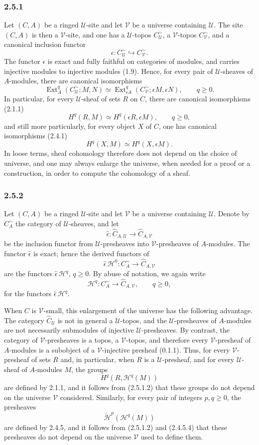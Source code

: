 \documentclass[11pt]{article}
\newcommand{\U}{\mathcal{U}}
\newcommand{\V}{\mathcal{V}}
\newcommand{\Hh}{\mathcal{H}}
\newcommand{\Ext}{\operatorname{Ext}}
\begin{document}
\subsubsection*{2.5.1}
Let $(C,A)$ be a ringed $\U$-site and let $\V$ be a universe containing $\U$. The site $(C,A)$ is then a $\V$-site, and one has a $\U$-topos $C^\sim_\U$, a $\V$-topos $C^\sim_\V$, and a canonical inclusion functor
\[
\epsilon:C^\sim_\U\hookrightarrow C^\sim_\V .
\]
The functor $\epsilon$ is exact and fully faithful on categories of modules, and carries injective modules to injective modules (1.9). Hence, for every pair of $\U$-sheaves of $A$-modules, there are canonical isomorphisms
\[
\Ext_A^q(C^\sim_\U;M,N)
\simeq
\Ext_{\epsilon A}^q(C^\sim_\V;\epsilon M,\epsilon N),
\qquad q\geq0.
\tag{2.5.1.1}
\]
In particular, for every $\U$-sheaf of sets $R$ on $C$, there are canonical isomorphisms (2.1.1)
\[
H^q(R,M)\simeq H^q(\epsilon R,\epsilon M),
\qquad q\geq0,
\tag{2.5.1.2}
\]
and still more particularly, for every object $X$ of $C$, one has canonical isomorphisms (2.4.1)
\[
H^q(X,M)\simeq H^q(X,\epsilon M).
\tag{2.5.1.3}
\]
In loose terms, sheaf cohomology therefore does not depend on the choice of universe, and one may always enlarge the universe, when needed for a proof or a construction, in order to compute the cohomology of a sheaf.

\subsubsection*{2.5.2}
Let $(C,A)$ be a ringed $\U$-site and let $\V$ be a universe containing $\U$. Denote by $C^\sim_A$ the category of $\U$-sheaves, and let
\[
\widehat\epsilon:\widehat C_{A,\U}\longrightarrow \widehat C_{A,\V}
\]
be the inclusion functor from $\U$-presheaves into $\V$-presheaves of $A$-modules. The functor $\widehat\epsilon$ is exact; hence the derived functors of
\[
\widehat\epsilon\,\Hh^0:C^\sim_A\longrightarrow \widehat C_{A,\V}
\]
are the functors $\widehat\epsilon\,\Hh^q$, $q\geq0$. By abuse of notation, we again write
\[
\Hh^q:C^\sim_A\longrightarrow \widehat C_{A,\V},
\qquad q\geq0,
\]
for the functors $\widehat\epsilon\,\Hh^q$.

When $C$ is $\V$-small, this enlargement of the universe has the following advantage. The category $\widehat C_\U$ is not in general a $\U$-topos, and the $\U$-presheaves of $A$-modules are not necessarily submodules of injective $\U$-presheaves. By contrast, the category of $\V$-presheaves is a topos, a $\V$-topos, and therefore every $\V$-presheaf of $A$-modules is a subobject of a $\V$-injective presheaf (0.1.1). Thus, for every $\V$-presheaf of sets $R$ and, in particular, when $R$ is a $\U$-presheaf, and for every $\U$-sheaf of $A$-modules $M$, the groups
\[
H^q(R,\Hh^q(M))
\]
are defined by 2.1.1, and it follows from (2.5.1.2) that these groups do not depend on the universe $\V$ considered. Similarly, for every pair of integers $p,q\geq0$, the presheaves
\[
\check{\Hh}^p(\Hh^q(M))
\]
are defined by 2.4.5, and it follows from (2.5.1.2) and (2.4.5.4) that these presheaves do not depend on the universe $\V$ used to define them.
\end{document}
